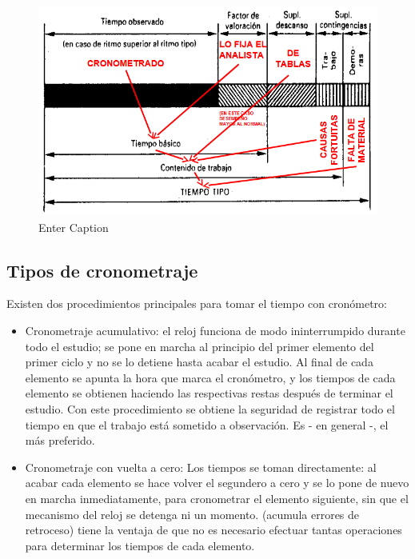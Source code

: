 \documentclass[a4paper,oneside,11pt]{article}
\begin{document}
\begin{itemize}
    \begin{figure} [ht!]
        \centering
        \includegraphics[scale=0.8]{tiempo tipo.png}
        \caption{Enter Caption}
        \label{fig:tiempo tipo}
    \end{figure}
    
\end{itemize}



\subsection{Tipos de cronometraje}

Existen dos procedimientos principales para tomar el tiempo con cronómetro:

    \begin{itemize}
        \item Cronometraje acumulativo: el reloj funciona de modo ininterrumpido durante todo el estudio; se pone en marcha al principio del primer elemento del primer ciclo y no se lo detiene hasta acabar el estudio. Al final de cada elemento se apunta la hora que marca el cronómetro, y los tiempos de cada elemento se obtienen haciendo las respectivas restas después de terminar el estudio. Con este procedimiento se obtiene la seguridad de registrar todo el tiempo en que el trabajo está sometido a observación. Es - en general -, el más preferido.
        \item Cronometraje con vuelta a cero: Los tiempos se toman directamente: al acabar cada elemento se hace volver el segundero a cero y se lo pone de nuevo en marcha inmediatamente, para cronometrar el elemento siguiente, sin que el mecanismo del reloj se detenga ni un momento. (acumula errores de retroceso) tiene la ventaja de que no es necesario efectuar tantas operaciones para determinar los tiempos de cada elemento.
    \end{itemize}
\end{document}
